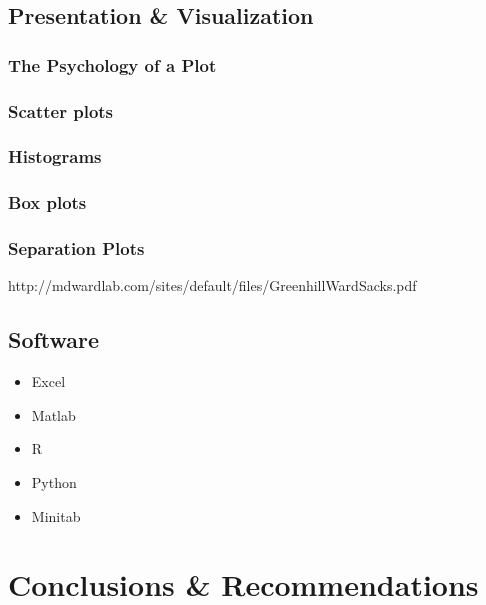 \documentclass[11pt,a4paper,article]{memoir} %
\begin{document}
\section{Presentation \& Visualization}
\subsection{The Psychology of a Plot}
\subsection{Scatter plots}
\subsection{Histograms}
\subsection{Box plots}
\subsection{Separation Plots}
http://mdwardlab.com/sites/default/files/GreenhillWardSacks.pdf

\section{Software}
\begin{itemize}
\item Excel
\item Matlab
\item R
\item Python
\item Minitab
\end{itemize}

\newpage
\chapter{Conclusions \& Recommendations}

\newpage
\appendix
\chapter{}

\end{document}
